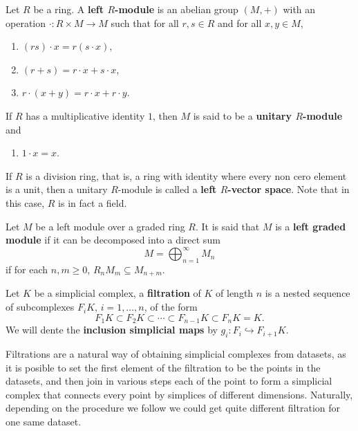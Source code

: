 \begin{definition}
    Let $ R $ be a ring. A {\bf left $R$-module } is an abelian group $ (M, +) $ with an operation $ \cdot \colon R \times M \to M $ such that for all $ r, s \in R $ and for all $ x, y \in M $,
    \begin{enumerate}
    \renewcommand{\labelenumi}{(\roman{enumi})}
        \item $ (rs) \cdot x = r (s \cdot x) $,
        \item $ (r + s) = r \cdot x + s \cdot x $,
        \item $ r \cdot (x + y) = r \cdot x + r \cdot y $.
    \end{enumerate}
    If $ R $ has a multiplicative identity $ 1 $, then $ M $ is said to be a {\bf unitary $R$-module} and 
    \begin{enumerate}
    \renewcommand{\labelenumi}{(\roman{enumi})}
        \setcounter{enumi}{3}
        \item $1 \cdot x = x $.
    \end{enumerate}
    If $ R $ is a division ring, that is, a ring with identity where every non cero element is a unit, then 
    a unitary $R$-module is called a {\bf left $R$-vector space}. Note that in this case, $R$ is in fact a field.
\end{definition}

\begin{definition}
    Let $M$ be a left module over a graded ring $ R $. It is said that $ M $ is a {\bf left graded module} if it can be decomposed into a direct sum
    $$
        M = \bigoplus_{n=1}^{\infty} M_n
    $$
    if for each $n, m \geq 0 $, $ R_n M_m \subseteq M_{n+m} $.
\end{definition}

\begin{definition}[Filtration]
    Let $ K $ be a simplicial complex, a {\bf filtration} of $ K $ of length $ n $ is a nested sequence of subcomplexes $ F_i K $, $ i = 1, \dots , n $, of the form
    \begin{equation}
        F_1K \subset F_2K \subset \cdots \subset F_{n-1}K \subset F_nK = K.
    \end{equation}
    We will dente the {\bf inclusion simplicial maps} by $ g_i \colon F_i \hookrightarrow F_{i+1} K $.
\end{definition}

Filtrations are a natural way of obtaining simplicial complexes from datasets, as it is posible to set the first element of the filtration to be the points in the datasets, and then join in various steps each of the point to form a simplicial complex that connects every point by simplices of different dimensions. Naturally, depending on the procedure we follow we could get quite different filtration for one same dataset.

